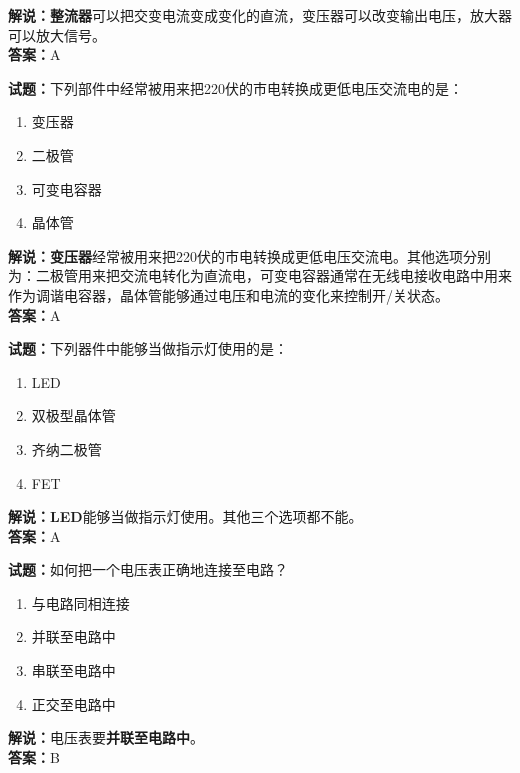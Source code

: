\documentclass{ctexbook}
\begin{document}
\noindent\textbf{解说：整流器}可以把交变电流变成变化的直流，变压器可以改变输出电压，放大器可以放大信号。\\\noindent\textbf{答案：}A

\bigskip

\noindent\textbf{试题：}下列部件中经常被用来把220伏的市电转换成更低电压交流电的是：

\begin{enumerate}[leftmargin=3em]
  \item 变压器
  \item 二极管
  \item 可变电容器
  \item 晶体管
\end{enumerate}

\noindent\textbf{解说：变压器}经常被用来把220伏的市电转换成更低电压交流电。其他选项分别为：二极管用来把交流电转化为直流电，可变电容器通常在无线电接收电路中用来作为调谐电容器，晶体管能够通过电压和电流的变化来控制开/关状态。\\\noindent\textbf{答案：}A

\bigskip

\noindent\textbf{试题：}下列器件中能够当做指示灯使用的是：

\begin{enumerate}[leftmargin=3em]
  \item LED
  \item 双极型晶体管
  \item 齐纳二极管
  \item FET
\end{enumerate}

\noindent\textbf{解说：LED}能够当做指示灯使用。其他三个选项都不能。\\\noindent\textbf{答案：}A

\bigskip

\noindent\textbf{试题：}如何把一个电压表正确地连接至电路？

\begin{enumerate}[leftmargin=3em]
  \item 与电路同相连接
  \item 并联至电路中
  \item 串联至电路中
  \item 正交至电路中
\end{enumerate}

\noindent\textbf{解说：}电压表要\textbf{并联至电路中}。\\\noindent\textbf{答案：}B

\bigskip
\end{document}
